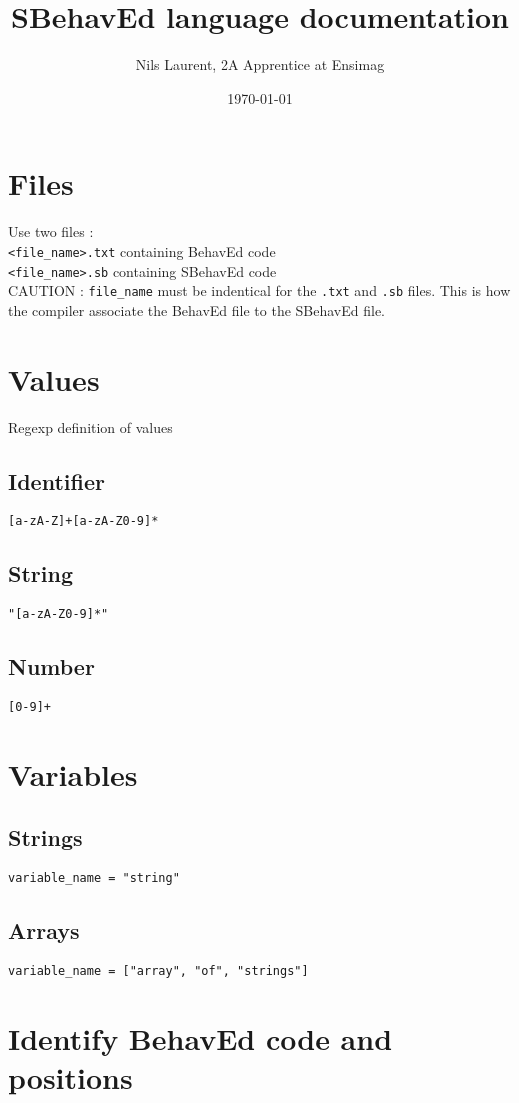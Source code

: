 \documentclass{article}
\title{SBehavEd language documentation}
\author{Nils Laurent, 2A Apprentice at Ensimag}
\date{\today}
\begin{document}
\maketitle

\section{Files}
Use two files :\\
\texttt{<file_name>.txt} containing BehavEd code\\
\texttt{<file_name>.sb} containing SBehavEd code\\
CAUTION : \texttt{file_name} must be indentical for the \texttt{.txt} and \texttt{.sb} files. This is how the compiler associate the BehavEd file to the SBehavEd file.

\section{Values}
Regexp definition of values
\subsection{Identifier}
\texttt{[a-zA-Z]+[a-zA-Z0-9]*}
\subsection{String}
\texttt{"[a-zA-Z0-9]*"}
\subsection{Number}
\texttt{[0-9]+}


\section{Variables}
\subsection{Strings}
\begin{lstlisting}
variable_name = "string"
\end{lstlisting}
\subsection{Arrays}
\begin{lstlisting}
variable_name = ["array", "of", "strings"]
\end{lstlisting}

\newpage
\section{Identify BehavEd code and positions}
\end{document}
